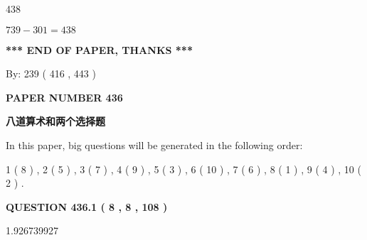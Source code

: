 \documentclass{ctexart}
\begin{document}
438
 
 
 
 
\noindent{}

$ %
739 -  %
301=   %
438$
 
 
   
   
 \vspace{0.2in}
 
   
   
   
   
\vspace{1.0in} 
{\textbf{\large{ *** END OF PAPER, THANKS *** }}} 
   
   
\hspace{1.0in} By: 
 239 ( 416 ,  443 )
   
   
   
   
\newpage 
\setcounter{page}{ 
   436001 } 
   
   
   
   
 {\textbf{ \Large{ PAPER NUMBER  436  }}}
   
   
\vspace{0.2in}
   
   
   
   
   
   
 \vspace{0.2in}
{\LARGE {\textbf{ 八道算术和两个选择题}}}
   
   
   
\vspace{0.2in}
   
In this paper, big questions will be generated in the following order: 
   
   
   1 ( 8 )
 ,
   2 ( 5 )
 ,
   3 ( 7 )
 ,
   4 ( 9 )
 ,
   5 ( 3 )
 ,
   6 ( 10 )
 ,
   7 ( 6 )
 ,
   8 ( 1 )
 ,
   9 ( 4 )
 ,
   10 ( 2 )
 .
  
\vspace{0.2in}
  
{\textbf{\Large{QUESTION
436.1 
 ( 8 , 8 , 108 )
}}}
  
  
 
 
\noindent{}

1.926739927
 
 
 
 
\noindent{}
\end{document}
